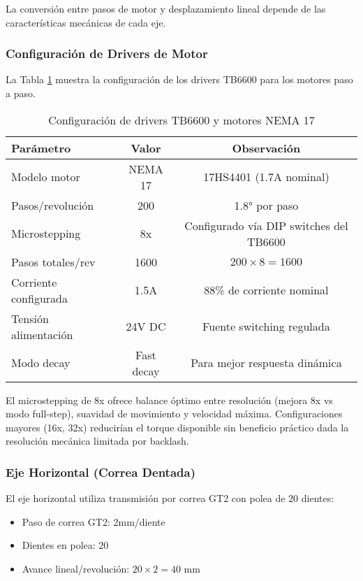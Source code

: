 La conversión entre pasos de motor y desplazamiento lineal depende de las características mecánicas de cada eje.

\subsubsection{Configuración de Drivers de Motor}

La Tabla \ref{tab:config_drivers} muestra la configuración de los drivers TB6600 para los motores paso a paso.

\begin{table}[H]
\centering
\caption{Configuración de drivers TB6600 y motores NEMA 17}
\label{tab:config_drivers}
\begin{tabular}{|l|c|c|}
\hline
\textbf{Parámetro} & \textbf{Valor} & \textbf{Observación} \\
\hline
Modelo motor & NEMA 17 & 17HS4401 (1.7A nominal) \\
\hline
Pasos/revolución & 200 & 1.8° por paso \\
\hline
Microstepping & 8x & Configurado vía DIP switches del TB6600 \\
\hline
Pasos totales/rev & 1600 & $200 \times 8 = 1600$ \\
\hline
Corriente configurada & 1.5A & 88\% de corriente nominal \\
\hline
Tensión alimentación & 24V DC & Fuente switching regulada \\
\hline
Modo decay & Fast decay & Para mejor respuesta dinámica \\
\hline
\end{tabular}
\end{table}

El microstepping de 8x ofrece balance óptimo entre resolución (mejora 8x vs modo full-step), suavidad de movimiento y velocidad máxima. Configuraciones mayores (16x, 32x) reducirían el torque disponible sin beneficio práctico dada la resolución mecánica limitada por backlash.

\subsubsection{Eje Horizontal (Correa Dentada)}

El eje horizontal utiliza transmisión por correa GT2 con polea de 20 dientes:

\begin{itemize}
    \item Paso de correa GT2: 2mm/diente
    \item Dientes en polea: 20
    \item Avance lineal/revolución: $20 \times 2 = 40$ mm
\end{itemize}


